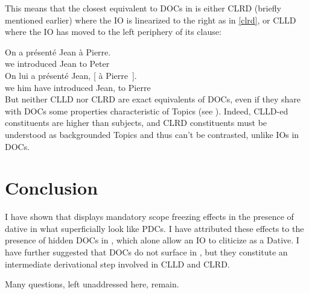 \documentclass[output=paper]{langsci/langscibook}
\begin{document}
This means that the closest equivalent to  \glspl{DOC} in  is either \gls{CLRD} (briefly mentioned earlier) where the IO is linearized to the
right as in \eqref{clrd}, or \gls{CLLD} where the
IO has moved to the left periphery of its clause:

\ea \label{clrd}
\ea
    \gll  On {a pr\'{e}sent\'{e}} Jean \`a Pierre.\\
    we introduced Jean to Peter\\
\ex
	\gll  On      lui a   pr\'{e}sent\'{e}    Jean,  [ \`a Pierre~].\\
    we  him\tss{\Dat} have introduced     Jean, {} to Pierre \\
\z
\z
%
But neither CLLD nor \gls{CLRD} are exact
equivalents of \glspl{DOC}, even if they share with \glspl{DOC} some properties
characteristic of Topics (see \citealt{Polinsky:1996}). Indeed, \gls{CLLD}-ed
constituents are higher than subjects, and \gls{CLRD} constituents must be understood as backgrounded Topics and thus
can't be contrasted, unlike \glspl{IO} in \glspl{DOC}.

\section{Conclusion}

I have shown that  displays mandatory scope freezing effects in the
presence of dative  in what superficially look like \glspl{PDC}. I have
attributed these effects to the presence of hidden \glspl{DOC} in , which
alone allow an IO to cliticize as a Dative. I have further suggested that
\glspl{DOC} do not surface in , but they constitute an intermediate
derivational step  involved in \gls{CLLD} and
\gls{CLRD}.

Many questions, left unaddressed here, remain.
\end{document}
